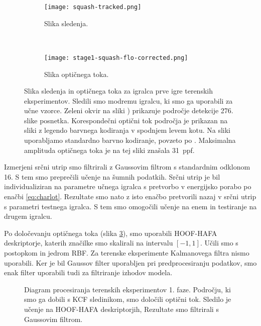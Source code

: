 \begin{figure}[!htb]
	\centering
	\begin{subfigure}[t]{0.45\columnwidth}
		\centering
		\texttt{[image: squash-tracked.png]}
		\caption{Slika sledenja.}
	    \label{fig:sledenje-squash}
	\end{subfigure}
	~
	\begin{subfigure}[t]{0.45\columnwidth}
		\centering
		\texttt{[image: stage1-squash-flo-corrected.png]}
		\caption{Slika optičnega toka.}
		\label{fig:of-squash}
	\end{subfigure}
	\caption[Slika sledenja in optičnega toka za igralca terenskih eksperimentov]{Slika sledenja in optičnega toka za igralca prve igre terenskih eksperimentov. Sledili smo modremu igralcu, ki smo ga uporabili za učne vzorce. Zeleni okvir na sliki ) prikazuje področje detekcije 276. slike posnetka. Korespondečni optični tok področja je prikazan na sliki  z legendo barvnega kodiranja v spodnjem levem kotu. Na sliki uporabljamo standardno barvno kodiranje, povzeto po \cite{baker2011database}. Maksimalna amplituda optičnega toka je na tej sliki znašala \SI{31}{ppf}. }
	\label{fig:squash}
\end{figure}

Izmerjeni srčni utrip smo filtrirali z Gaussovim filtrom s standardnim odklonom \num{16}. S tem smo preprečili učenje na šumnih podatkih. Srčni utrip je bil individualiziran na parametre učnega igralca s pretvorbo v energijsko porabo po enačbi \eqref{eq:charlot}. Rezultate smo nato z isto enačbo pretvorili nazaj v srčni utrip s parametri testnega igralca. S tem smo omogočili učenje na enem in testiranje na drugem igralcu. 

Po določevanju optičnega toka (slika \ref{fig:squash}), smo uporabili HOOF-HAFA deskriptorje, katerih značilke smo skalirali na intervalu $[-1,1]$. Učili smo s postopkom \esvr in jedrom RBF. Za terenske eksperimente Kalmanovega filtra nismo uporabili. Ker je bil Gaussov filter uporabljen pri predprocesiranju podatkov, smo enak filter uporabili tudi za filtriranje izhodov modela.

\begin{figure}[!htb]
	\centering
	\resizebox{\columnwidth}{!}{}
	\caption[Diagram procesiranja terenskih eksperimentov 1. faze]{Diagram procesiranja terenskih eksperimentov 1. faze. Področju, ki smo ga dobili s KCF sledinikom, smo določili optični tok. Sledilo je učenje na HOOF-HAFA deskriptorjih, Rezultate smo filtrirali s Gaussovim filtrom.}
	\label{fig:diagram-procesiranja-field-stag1}
\end{figure}

















